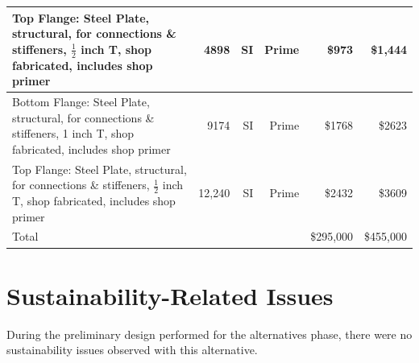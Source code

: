 \begin{table}[H]
{\begin{tabular}{p{4cm}rrrrr}
Top Flange: Steel Plate, structural, for connections \&  stiffeners, $\frac{1}{2}$ inch T, shop fabricated, includes shop primer & 4898   & SI & Prime & \$973     & \$1,444         \\ \midrule
Bottom Flange: Steel Plate, structural, for connections \&  stiffeners, 1 inch T, shop fabricated, includes shop primer          & 9174   & SI & Prime & \$1768    & \$2623           \\ \midrule
Top Flange: Steel Plate, structural, for connections \& stiffeners, $\frac{1}{2}$ inch T, shop fabricated, includes shop primer  & 12,240 & SI & Prime & \$2432    & \$3609            \\ \midrule
Total & & & &  \$295,000 & \$455,000  \\\bottomrule
\end{tabular}}
\end{table}

\section{Sustainability-Related Issues}
During the preliminary design performed for the alternatives phase, there were no sustainability issues observed with this alternative.